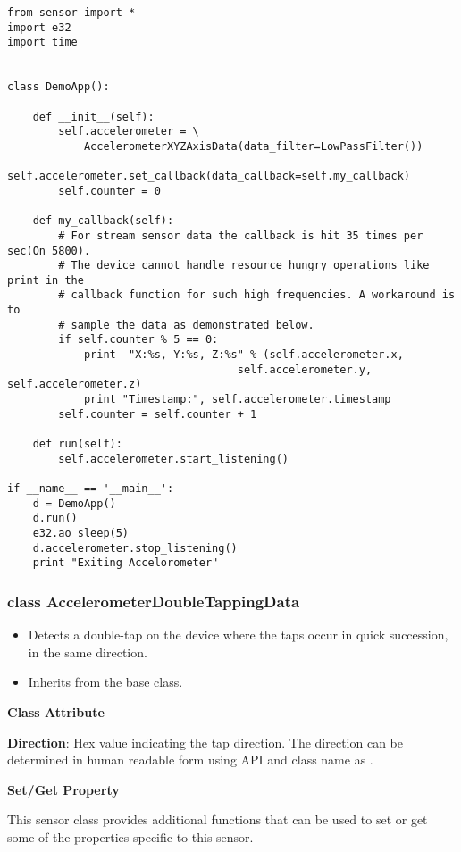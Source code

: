 \begin{verbatim}
from sensor import *
import e32
import time


class DemoApp():

    def __init__(self):
        self.accelerometer = \
            AccelerometerXYZAxisData(data_filter=LowPassFilter())
        self.accelerometer.set_callback(data_callback=self.my_callback)
        self.counter = 0

    def my_callback(self):
        # For stream sensor data the callback is hit 35 times per sec(On 5800).
        # The device cannot handle resource hungry operations like print in the
        # callback function for such high frequencies. A workaround is to
        # sample the data as demonstrated below.
        if self.counter % 5 == 0:
            print  "X:%s, Y:%s, Z:%s" % (self.accelerometer.x,
                                    self.accelerometer.y, self.accelerometer.z)
            print "Timestamp:", self.accelerometer.timestamp
        self.counter = self.counter + 1

    def run(self):
        self.accelerometer.start_listening()

if __name__ == '__main__':
    d = DemoApp()
    d.run()
    e32.ao_sleep(5)
    d.accelerometer.stop_listening()
    print "Exiting Accelorometer"
\end{verbatim}

\subsubsection{class AccelerometerDoubleTappingData}

\begin{itemize}
\item Detects a double-tap on the device where the taps occur in quick succession, in the same direction.
\item Inherits from the \class{_Sensor} base class.
\end{itemize}

{\bf Class Attribute} \break

{\bf Direction}: Hex value indicating the tap direction. The direction can be determined in human readable form using  API and class name as .

{\bf Set/Get Property} \break

This sensor class provides additional functions that can be used to set or get some of the properties specific to this sensor.

